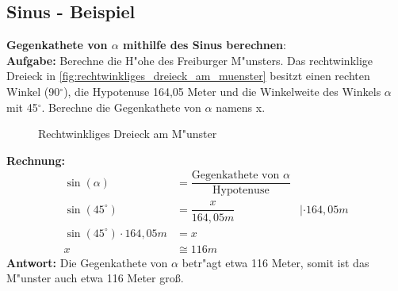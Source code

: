 \documentclass{standalone}
\begin{document}
\subsection{Sinus - Beispiel}
\textbf{Gegenkathete von $\alpha$ mithilfe des Sinus berechnen}: \\
\textbf{Aufgabe:} Berechne die H{"o}he des Freiburger M{"u}nsters. Das rechtwinklige Dreieck in \autoref{fig:rechtwinkliges_dreieck_am_muenster} besitzt einen rechten Winkel (90$^\circ$), die Hypotenuse 164,05 Meter und die Winkelweite des Winkels $\alpha$ mit 45$^\circ$. Berechne die Gegenkathete von $\alpha$ namens x.\\
\begin{figure}[hb!]
  \centeringf
  \centering
  \def\svgwidth{300px}
  
  \caption{Rechtwinkliges Dreieck am M{"u}nster}
  \label{fig:rechtwinkliges_dreieck_am_muenster}
\end{figure}

\noindent\textbf{Rechnung:}
\begin{align}
  \sin(\alpha)                  & = \dfrac{\text{Gegenkathete von $\alpha$}}{\text{Hypotenuse}} \tag{1}                                                     \\
  \sin(45^\circ )               & = \dfrac{x}{164,05m}                                                                             & |\cdot 164,05m \tag{2} \\
  \sin(45^\circ ) \cdot 164,05m & = x                                                                                      \tag{3}                          \\
  x                             & \cong 116m \tag{4}
\end{align}
\textbf{Antwort:} Die Gegenkathete von $\alpha$ betr{"a}gt etwa 116 Meter, somit ist das M{"u}nster auch etwa 116 Meter gro{\ss}.
\end{document}
